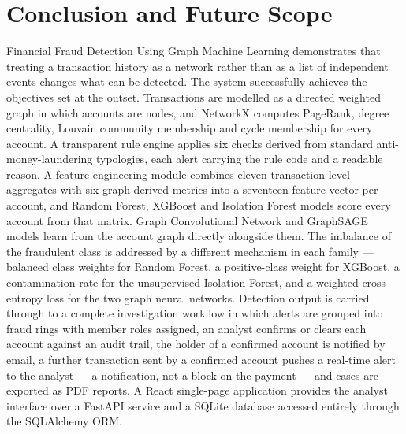 \chapter{Conclusion and Future Scope}

Financial Fraud Detection Using Graph Machine Learning demonstrates that treating a transaction history as a network rather than as a list of independent events changes what can be detected. The system successfully achieves the objectives set at the outset. Transactions are modelled as a directed weighted graph in which accounts are nodes, and NetworkX computes PageRank, degree centrality, Louvain community membership and cycle membership for every account. A transparent rule engine applies six checks derived from standard anti-money-laundering typologies, each alert carrying the rule code and a readable reason. A feature engineering module combines eleven transaction-level aggregates with six graph-derived metrics into a seventeen-feature vector per account, and Random Forest, XGBoost and Isolation Forest models score every account from that matrix. Graph Convolutional Network and GraphSAGE models learn from the account graph directly alongside them. The imbalance of the fraudulent class is addressed by a different mechanism in each family --- balanced class weights for Random Forest, a positive-class weight for XGBoost, a contamination rate for the unsupervised Isolation Forest, and a weighted cross-entropy loss for the two graph neural networks. Detection output is carried through to a complete investigation workflow in which alerts are grouped into fraud rings with member roles assigned, an analyst confirms or clears each account against an audit trail, the holder of a confirmed account is notified by email, a further transaction sent by a confirmed account pushes a real-time alert to the analyst --- a notification, not a block on the payment --- and cases are exported as PDF reports. A React single-page application provides the analyst interface over a FastAPI service and a SQLite database accessed entirely through the SQLAlchemy ORM.

